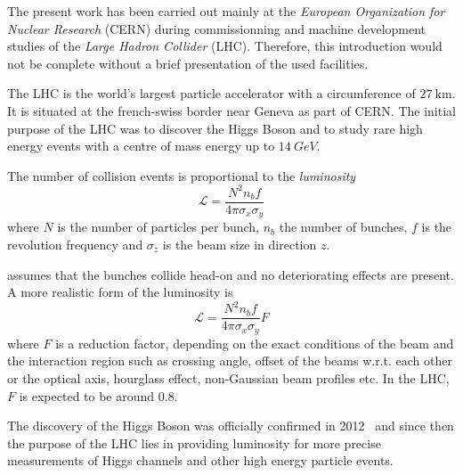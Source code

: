The present work has been carried out mainly at
the \emph{European Organization for Nuclear Research} (CERN) during commissionning and
machine development studies of
the \emph{Large Hadron Collider} (LHC).
Therefore, this introduction would not be complete without a brief presentation of the used facilities.

The LHC
 is the world's largest particle accelerator with a circumference
of $\SI{27}{\kilo\meter}$. It is situated at the french-swiss border near Geneva as part of
CERN.
The initial purpose of the LHC was to discover the Higgs Boson and to study rare high energy events 
with a centre of mass energy up to $\SI{14}{GeV}$.

The number of collision events is proportional to the \emph{luminosity}
%
\begin{equation}
    \mathscr{L} = \frac{N^2 n_b f}{4\pi\sigma_x\sigma_y}
    \label{eq_lumi}
\end{equation}
%
where $N$ is the number of particles per bunch, $n_b$ the number of bunches, $f$ is
the revolution frequency and $\sigma_z$ is the beam size in direction $z$.

 assumes that the bunches collide head-on and no deteriorating effects are present. A more realistic form of the luminosity is~\cite{Herr2003}
%
\begin{equation}
    \mathscr{L} = \frac{N^2 n_b f}{4\pi\sigma_x\sigma_y} F
\end{equation}
%
where $F$ is a reduction factor, depending on the exact conditions of the beam and the interaction region such as crossing angle, offset of the beams w.r.t. each other or the optical axis, hourglass effect, non-Gaussian beam profiles etc. In the LHC, $F$ is expected to be around $0.8$. 

The discovery of the Higgs Boson was officially confirmed in 2012~\cite{higgs_1, higgs_2} and since then the
purpose of the LHC lies in providing luminosity for more precise measurements of Higgs channels and
other high energy particle events. 

